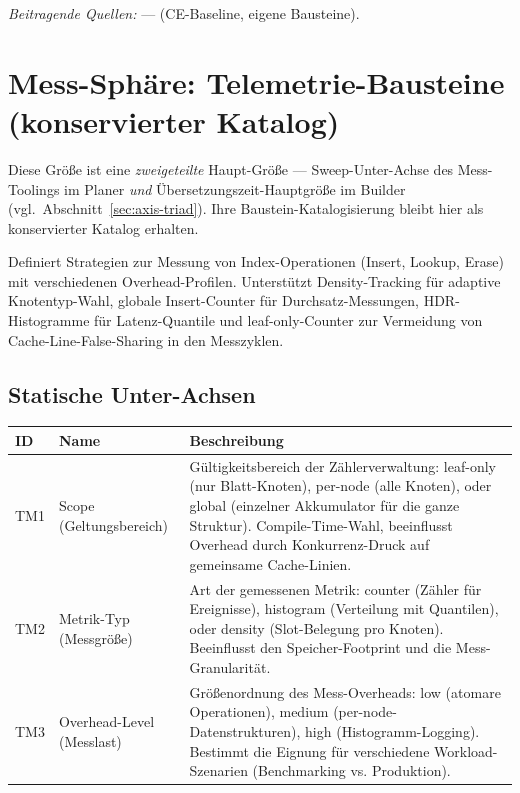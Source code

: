 \emph{Beitragende Quellen:} --- (CE-Baseline, eigene Bausteine).

\section{Mess-Sphäre: Telemetrie-Bausteine (konservierter Katalog)}

Diese Größe ist eine \emph{zweigeteilte} Haupt-Größe --- Sweep-Unter-Achse des Mess-Toolings im Planer \emph{und} Übersetzungszeit-Hauptgröße im Builder (vgl.\ Abschnitt~\ref{sec:axis-triad}). Ihre Baustein-Katalogisierung bleibt hier als konservierter Katalog erhalten.

Definiert Strategien zur Messung von Index-Operationen (Insert, Lookup, Erase) mit verschiedenen Overhead-Profilen. Unterstützt Density-Tracking für adaptive Knotentyp-Wahl, globale Insert-Counter für Durchsatz-Messungen, HDR-Histogramme für Latenz-Quantile und leaf-only-Counter zur Vermeidung von Cache-Line-False-Sharing in den Messzyklen.

\subsection*{Statische Unter-Achsen}

\begin{scriptsize}
\begin{longtable}{@{}>{\raggedright\arraybackslash}p{1.8cm} >{\raggedright\arraybackslash}p{3.2cm} >{\raggedright\arraybackslash}p{8.5cm}@{}}
\toprule
ID & Name & Beschreibung \\
\midrule
\endhead%
TM1 & Scope (Geltungsbereich) & Gültigkeitsbereich der Zählerverwaltung: leaf-only (nur Blatt-Knoten), per-node (alle Knoten), oder global (einzelner Akkumulator für die ganze Struktur). Compile-Time-Wahl, beeinflusst Overhead durch Konkurrenz-Druck auf gemeinsame Cache-Linien. \\
TM2 & Metrik-Typ (Messgröße) & Art der gemessenen Metrik: counter (Zähler für Ereignisse), histogram (Verteilung mit Quantilen), oder density (Slot-Belegung pro Knoten). Beeinflusst den Speicher-Footprint und die Mess-Granularität. \\
TM3 & Overhead-Level (Messlast) & Größenordnung des Mess-Overheads: low (atomare Operationen), medium (per-node-Datenstrukturen), high (Histogramm-Logging). Bestimmt die Eignung für verschiedene Workload-Szenarien (Benchmarking vs. Produktion). \\
\bottomrule
\end{longtable}
\end{scriptsize}

